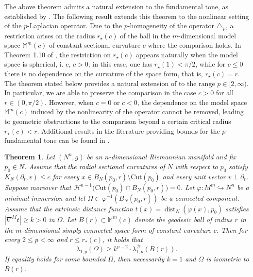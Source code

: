 \documentclass{article}
\newtheorem{theorem}{Theorem}[section]
\begin{document}
The above theorem admits a natural extension to the fundamental tone, as established by \cite{BessaMontenegro}. The following result extends this theorem to the nonlinear setting of the $p$-Laplacian operator. Due to the $p$-homogeneity of the operator $\triangle_p$, a restriction arises on the radius $r_\star(c)$ of the ball in the $m$-dimensional model space $\mathbb{M}^m(c)$ of constant sectional curvature $c$ where the comparison holds. In Theorem 1.10 of \cite{BessaMontenegro}, the restriction on $r_\star(c)$ appears naturally when the model space is spherical, i. e, $c>0$; in this case, one has $r_\star(1) < \pi/2$, while for $c \leq 0$ there is no dependence on the curvature of the space form, that is, $r_\star(c)=r$. The theorem stated below provides a natural extension of \cite[Theorem 1.10]{BessaMontenegro} to the range $p\in[2,\infty)$. In particular, we are able to preserve the comparison in the case $c>0$ for all $r\in(0,\pi/2)$. However, when $c=0$ or $c<0$, the dependence on the model space $\mathbb{M}^m(c)$ induced by the nonlinearity of the operator cannot be removed, leading to geometric obstructions to the comparison beyond a certain critical radius $r_\star(c)<r$. Additional results in the literature providing bounds for the $p$-fundamental tone can be found in \cite{BarrosoBessa2006, DuMao2017, matei, PHCsilvapPinch}.

\begin{theorem}\label{thm:pminsub_ball}
Let $(N^n,g)$ be an $n$-dimensional Riemannian manifold and fix $p_0\in N$. Assume that the radial sectional curvatures of $N$ with respect to $p_0$ satisfy $K_N(\partial_t,v) \leq c$ for every $x\in B_N(p_0,r)\setminus \mathrm{Cut}(p_0)$ and every unit vector 
$v\perp \partial_t$. Suppose moreover that $\mathcal{H}^{n-1}\!\big(\mathrm{Cut}(p_0)\cap B_N(p_0,r)\big)=0$. Let $\varphi:M^m\hookrightarrow N^n$ be a minimal immersion and let 
$\Omega\subset \varphi^{-1}(B_N(p_0,r))$ be a connected component. 
Assume that the extrinsic distance function $t(x)=\operatorname{dist}_N(\varphi(x),p_0)$ satisfies $|\nabla^M t|\ge k>0$ in $\Omega$. Let $B(r)\subset \mathbb{M}^m(c)$ denote the geodesic ball of radius $r$ in the 
$m$-dimensional simply connected space form of constant curvature $c$. 
Then for every $2\le p<\infty$ and $r\le r_\ast(c)$, it holds that
\[
\lambda_{1,p}(\Omega)
\ge
k^{p-2} \cdot \lambda_{1,p}^{\mathcal D}(B(r)).
\]
If equality holds for some bounded $\Omega$, then necessarily 
$k=1$ and $\Omega$ is isometric to $B(r)$.
\end{theorem}
\end{document}
